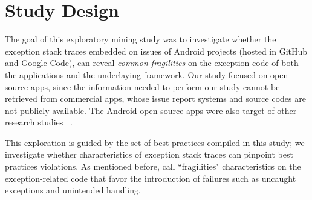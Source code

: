 \documentclass[conference]{IEEEtran}
\begin{document}

\section{Study Design}
\label{sec:study}


The goal of this exploratory mining study was to investigate whether the exception stack traces 
embedded on issues of Android projects (hosted in GitHub and Google Code), can reveal 
\emph{common fragilities} on the exception code of both the applications and the underlaying  framework. 
Our study focused on open-source apps, since the information needed to perform our study
cannot be retrieved from commercial apps, whose issue report systems and 
source codes are not publicly available. The Android open-source apps were also 
target of other research studies ~\cite{Linar13,ahimed}.   

This exploration is guided by the set of best practices compiled in this study; we investigate whether characteristics 
of exception stack traces can pinpoint best practices violations. As mentioned before, 
call ``fragilities" characteristics on the exception-related code that favor the introduction
of failures such as uncaught exceptions and unintended handling. 
\end{document}
